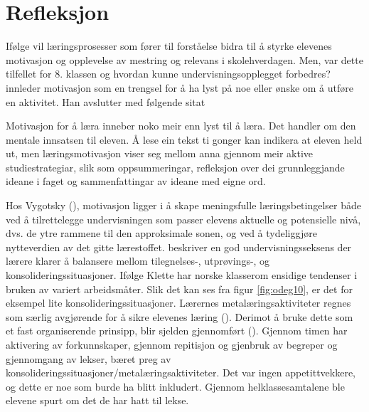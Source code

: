 \documentclass[main.tex]{subfiles}
\begin{document}
\section*{Refleksjon}
\label{sec:3}

Ifølge  vil læringsprosesser som fører til forståelse bidra til å styrke elevenes 
motivasjon og opplevelse av mestring og relevans i skolehverdagen. Men, var dette tilfellet for 8. 
klassen og hvordan kunne undervisningsopplegget forbedres?
\newline
\newline
{} innleder motivasjon som en trengsel for å ha lyst på noe eller ønske om å 
utføre en aktivitet. Han avslutter med følgende sitat
\begin{displayquote}
\guillemotleft Motivasjon for å læra inneber noko meir enn lyst til å læra. Det handler om den 
mentale innsatsen til eleven. Å lese ein tekst ti gonger kan indikera at eleven held ut, men  
læringsmotivasjon viser seg mellom anna gjennom meir aktive studiestrategiar, slik som 
oppsummeringar, refleksjon over dei grunnleggjande ideane i faget og sammenfattingar av ideane med 
eigne ord.\guillemotright 
\end{displayquote}
Hos Vygotsky (), motivasjon ligger i å skape meningsfulle læringsbetingelser 
både ved å tilrettelegge undervisningen som passer elevens aktuelle og potensielle nivå, dvs. 
de ytre rammene til den approksimale sonen, og ved å tydeliggjøre nytteverdien av det gitte 
lærestoffet. 
\newline
\newline
{} beskriver en god undervisningsseksens der lærere klarer å balansere mellom 
tilegnelses-, utprøvings-, og konsolideringssituasjoner. Ifølge Klette har norske klasserom ensidige 
tendenser i bruken av variert arbeidsmåter. Slik det kan ses fra figur \ref{fig:odeg10}, er det for 
eksempel lite konsolideringssituasjoner. Lærernes metalæringsaktiviteter regnes som særlig 
avgjørende for å sikre elevenes læring (). Derimot å bruke dette som et fast
organiserende prinsipp, blir sjelden gjennomført (). Gjennom timen har 
aktivering av forkunnskaper, gjennom repitisjon og gjenbruk av begreper og gjennomgang av 
lekser, bæret preg av konsolideringssituasjoner/metalæringsaktiviteter. Det var ingen 
appetittvekkere, og dette er noe som burde ha blitt inkludert.
\newline
\newline
Gjennom helklassesamtalene ble elevene spurt om det de har hatt til lekse.
\end{document}
